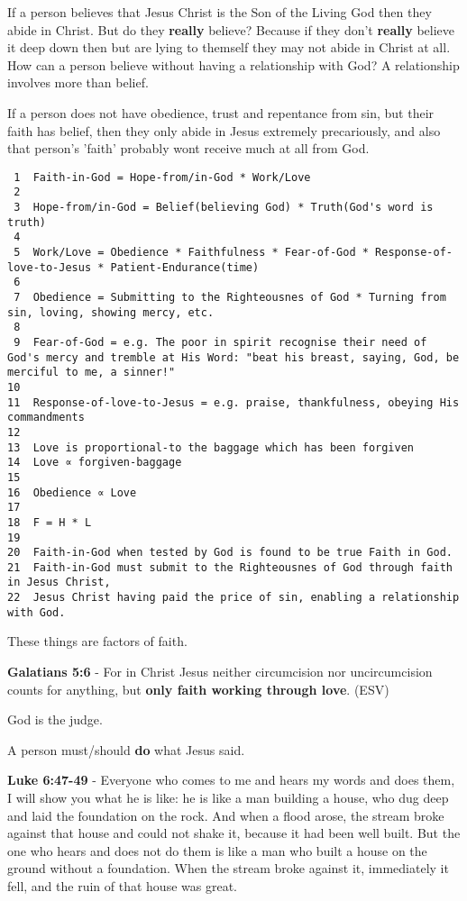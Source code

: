 \documentclass[11pt]{article}
\begin{document}
If a person believes that Jesus Christ is the Son of the Living God then they abide in Christ.
But do they \textbf{really} believe? Because if they don't \textbf{really} believe it deep down then but are lying to themself they may not abide in Christ at all.
How can a person believe without having a relationship with God? A relationship involves more than belief.

If a person does not have obedience, trust and
repentance from sin, but their faith has belief, then they only
abide in Jesus extremely precariously, and also that person's 'faith' probably wont receive much at all from God.

\begin{verbatim}
 1  Faith-in-God = Hope-from/in-God * Work/Love
 2  
 3  Hope-from/in-God = Belief(believing God) * Truth(God's word is truth)
 4  
 5  Work/Love = Obedience * Faithfulness * Fear-of-God * Response-of-love-to-Jesus * Patient-Endurance(time)
 6  
 7  Obedience = Submitting to the Righteousnes of God * Turning from sin, loving, showing mercy, etc.
 8  
 9  Fear-of-God = e.g. The poor in spirit recognise their need of God's mercy and tremble at His Word: "beat his breast, saying, God, be merciful to me, a sinner!"
10  
11  Response-of-love-to-Jesus = e.g. praise, thankfulness, obeying His commandments
12  
13  Love is proportional-to the baggage which has been forgiven
14  Love ∝ forgiven-baggage
15  
16  Obedience ∝ Love
17  
18  F = H * L
19  
20  Faith-in-God when tested by God is found to be true Faith in God.
21  Faith-in-God must submit to the Righteousnes of God through faith in Jesus Christ,
22  Jesus Christ having paid the price of sin, enabling a relationship with God.
\end{verbatim}

These things are factors of faith.

\textbf{Galatians 5:6} - For in Christ Jesus neither circumcision nor uncircumcision counts for anything, but \textbf{only faith working through love}. (ESV)

God is the judge.

A person must/should \textbf{do} what Jesus said.

\textbf{Luke 6:47-49} - Everyone who comes to me and hears my words and does them, I will show you what he is like: he is like a man building a house, who dug deep and laid the foundation on the rock. And when a flood arose, the stream broke against that house and could not shake it, because it had been well built.  But the one who hears and does not do them is like a man who built a house on the ground without a foundation. When the stream broke against it, immediately it fell, and the ruin of that house was great.
\end{document}
